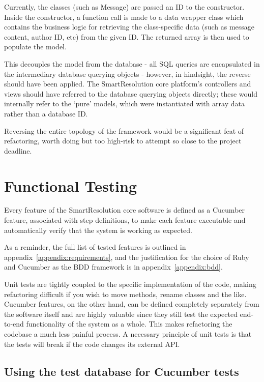 Currently, the classes (such as Message) are passed an ID to the constructor. Inside the constructor, a function call is made to a data wrapper class which contains the business logic for retrieving the class-specific data (such as message content, author ID, etc) from the given ID. The returned array is then used to populate the model.

This decouples the model from the database - all SQL queries are encapsulated in the intermediary database querying objects - however, in hindsight, the reverse should have been applied. The SmartResolution core platform's controllers and views should have referred to the database querying objects directly; these would internally refer to the `pure' models, which were instantiated with array data rather than a database ID.

Reversing the entire topology of the framework would be a significant feat of refactoring, worth doing but too high-risk to attempt so close to the project deadline.

\section{Functional Testing}

Every feature of the SmartResolution core software is defined as a Cucumber feature, associated with step definitions, to make each feature executable and automatically verify that the system is working as expected.

As a reminder, the full list of tested features is outlined in appendix~\ref{appendix:requirements}, and the justification for the choice of Ruby and Cucumber as the BDD framework is in appendix~\ref{appendix:bdd}.

Unit tests are tightly coupled to the specific implementation of the code, making refactoring difficult if you wish to move methods, rename classes and the like. Cucumber features, on the other hand, can be defined completely separately from the software itself and are highly valuable since they still test the expected end-to-end functionality of the system as a whole. This makes refactoring the codebase a much less painful process. A necessary principle of unit tests is that the tests will break if the code changes its external API.

\subsection{Using the test database for Cucumber tests}

